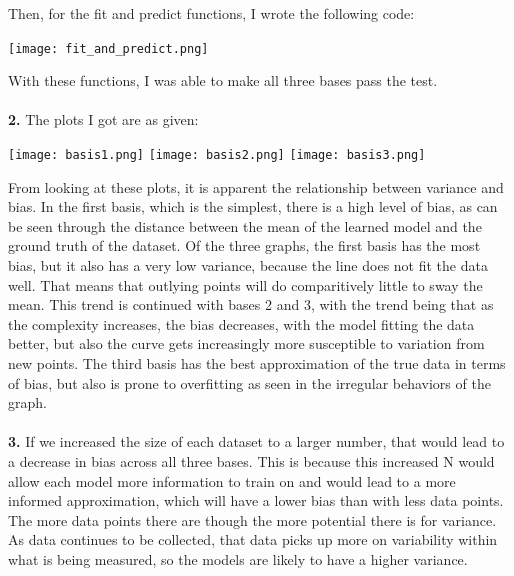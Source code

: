\documentclass[submit]{harvardml}
\begin{document}
Then, for the fit and predict functions, I wrote the following code: 
\begin{center}
  \texttt{[image: fit\_and\_predict.png]}
\end{center}

With these functions, I was able to make all three bases pass the test. \\\\

\textbf{2.} The plots I got are as given: 
\begin{center}
  \texttt{[image: basis1.png]} \texttt{[image: basis2.png]} \texttt{[image: basis3.png]}
\end{center}

From looking at these plots, it is apparent the relationship between variance and bias. In the first basis, which is the simplest, there is a high 
level of bias, as can be seen through the distance between the mean of the learned model and the ground truth of the dataset. Of the three graphs, the first basis has the most 
bias, but it also has a very low variance, because the line does not fit the data well. That means that outlying points will do comparitively little to sway the mean. This trend is 
continued with bases 2 and 3, with the trend being that as the complexity increases, the bias decreases, with the model fitting the data better, but also the curve gets 
increasingly more susceptible to variation from new points. The third basis has the best approximation of the true data in terms of bias, but also is prone to overfitting 
as seen in the irregular behaviors of the graph. \\\\

\textbf{3.} If we increased the size of each dataset to a larger number, that would lead to a decrease in bias across 
all three bases. This is because this increased N would allow each model more information to train on and would lead to a 
more informed approximation, which will have a lower bias than with less data points. The more data points there are though the 
more potential there is for variance. As data continues to be collected, that data picks up more on variability within what is being measured,
so the models are likely to have a higher variance. \\\\
\end{document}
